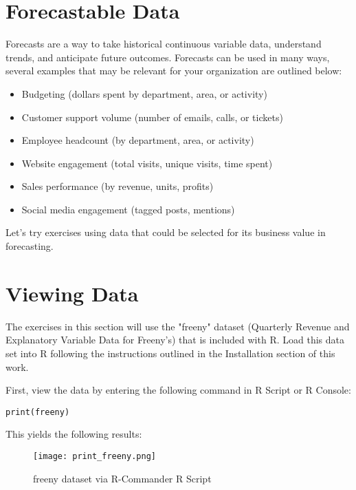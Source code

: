 %
%
%
%
%

\section{Forecastable Data}
Forecasts are a way to take historical continuous variable data, understand 
trends, and anticipate future outcomes. Forecasts can be used in many ways,
several examples that may be relevant for your organization are outlined below:

\begin{itemize}
 \item Budgeting (dollars spent by department, area, or activity)
 \item Customer support volume (number of emails, calls, or tickets)
 \item Employee headcount (by department, area, or activity)
 \item Website engagement (total visits, unique visits, time spent)
 \item Sales performance (by revenue, units, profits)
 \item Social media engagement (tagged posts, mentions)
\end{itemize}

Let's try exercises using data that could be selected for its business value 
in forecasting.

\section{Viewing Data}
The exercises in this section will use the "freeny" dataset (Quarterly Revenue 
and Explanatory Variable Data for Freeny's) that is included with R. Load this 
data set into R following the instructions outlined in the Installation section
 of this work.

First, view the data by entering the following command in R Script or R 
Console:

\texttt{print(freeny)}

This yields the following results:

\begin{figure}[h!]
\texttt{[image: print\_freeny.png]}
 \caption{freeny dataset via R-Commander R Script}
 \label{fig:print_freeny}
\end{figure}

